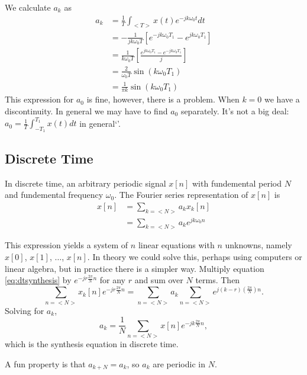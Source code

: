 We calculate $a_k$ as
\begin{align}
    a_k & = \frac{1}{T} \int_{<T>} x(t) e^{-jk\omega_0 t} dt                                         \\
        & = -\frac{1}{jk\omega_0 T} \left[ e^{-jk\omega_0 T_1} -  e^{jk\omega_0 T_1}\right]          \\
        & = \frac{1}{k\omega_0 T} \left[ \frac{e^{jk\omega_0 T_1} -  e^{-jk\omega_0 T_1}}{j} \right] \\
        & = \frac{2}{\omega_0 T} \sin(k \omega_0 T_1)                                                \\
        & = \frac{1}{\pi k} \sin(k \omega_0 T_1)
\end{align}
This expression for $a_0$ is fine, however, there is a problem. When
$k = 0$ we have a discontinuity. In general we may have to find $a_0$
separately. It's not a big deal: $a_0 = \frac{1}{T} \int_{-T_1}^{T_1} x(t) dt$ in general`'.

\subsection{Discrete Time}

In discrete time, an arbitrary periodic signal $x[n]$ with fundemental
period $N$ and fundemental frequency $\omega_0$. The Fourier series
representation of $x[n]$ is
\begin{align}\label{eq:dtsynthesis}
    x[n] & = \sum_{k=<N>} a_k x_k[n]           \\
         & = \sum_{k=<N>} a_k e^{jk\omega_0 n}
\end{align}

This expression yields a system of $n$ linear equations with $n$
unknowns, namely $x[0]$, $x[1]$, $\dots$, $x[n]$. In theory we
could solve this, perhaps using computers or linear algebra, but
in practice there is a simpler way. Multiply equation \ref{eq:dtsynthesis}
by $e^{-jr\frac{2\pi}{N}n}$ for any $r$ and sum over $N$ terms. Then
\begin{equation}
    \sum_{n=<N>} x_k[n] e^{-jr\frac{2\pi}{N}n} = \sum_{n=<N>} a_k \sum_{n=<N>} e^{j(k-r)(\frac{2\pi}{N})n}.
\end{equation}
Solving for $a_k$,
\begin{equation}
    a_k = \frac{1}{N} \sum_{n=<N>} x[n] e^{-jk\frac{2\pi}{N}n},
\end{equation}
which is the synthesis equation in discrete time.

A fun property is that $a_{k+N} = a_k$, so $a_k$ are periodic in $N$.

